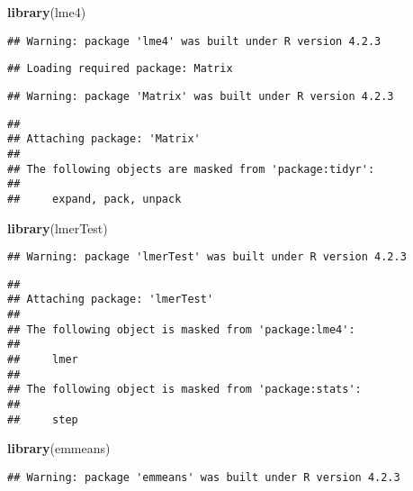 \documentclass[
]{article}
\newenvironment{Shaded}{\begin{snugshade}}{\end{snugshade}}
\newcommand{\FunctionTok}[1]{\textcolor[rgb]{0.13,0.29,0.53}{\textbf{#1}}}
\newcommand{\NormalTok}[1]{#1}
\begin{document}
\begin{Shaded}
\begin{Highlighting}[]
\FunctionTok{library}\NormalTok{(lme4)}
\end{Highlighting}
\end{Shaded}

\begin{verbatim}
## Warning: package 'lme4' was built under R version 4.2.3
\end{verbatim}

\begin{verbatim}
## Loading required package: Matrix
\end{verbatim}

\begin{verbatim}
## Warning: package 'Matrix' was built under R version 4.2.3
\end{verbatim}

\begin{verbatim}
## 
## Attaching package: 'Matrix'
## 
## The following objects are masked from 'package:tidyr':
## 
##     expand, pack, unpack
\end{verbatim}

\begin{Shaded}
\begin{Highlighting}[]
\FunctionTok{library}\NormalTok{(lmerTest)}
\end{Highlighting}
\end{Shaded}

\begin{verbatim}
## Warning: package 'lmerTest' was built under R version 4.2.3
\end{verbatim}

\begin{verbatim}
## 
## Attaching package: 'lmerTest'
## 
## The following object is masked from 'package:lme4':
## 
##     lmer
## 
## The following object is masked from 'package:stats':
## 
##     step
\end{verbatim}

\begin{Shaded}
\begin{Highlighting}[]
\FunctionTok{library}\NormalTok{(emmeans)}
\end{Highlighting}
\end{Shaded}

\begin{verbatim}
## Warning: package 'emmeans' was built under R version 4.2.3
\end{verbatim}
\end{document}
